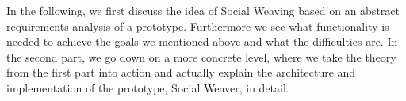 In the following, we first discuss the idea of Social Weaving based on an abstract requirements analysis of a prototype. Furthermore we see what functionality is needed to achieve the goals we mentioned above and what the difficulties are. In the second part, we go down on a more concrete level, where we take the theory from the first part into action and actually explain the architecture and implementation of the prototype, Social Weaver, in detail.

